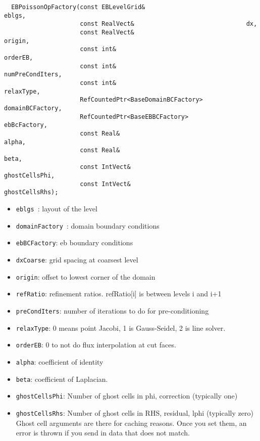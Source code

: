 \begin{small}\begin{verbatim}
  EBPoissonOpFactory(const EBLevelGrid&                            eblgs,
                     const RealVect&                               dx,
                     const RealVect&                               origin,
                     const int&                                    orderEB,
                     const int&                                    numPreCondIters,
                     const int&                                    relaxType,
                     RefCountedPtr<BaseDomainBCFactory>            domainBCFactory,
                     RefCountedPtr<BaseEBBCFactory>                ebBcFactory,
                     const Real&                                   alpha,
                     const Real&                                   beta,
                     const IntVect&                                ghostCellsPhi,
                     const IntVect&                                ghostCellsRhs);
\end{verbatim}\end{small}
\begin{itemize}
     \item {\tt eblgs }: layout of the level
     \item {\tt domainFactory }: domain boundary conditions 
     \item {\tt ebBCFactory}:    eb boundary conditions 
     \item {\tt dxCoarse}:      grid spacing at coarsest level 
     \item {\tt origin}:        offset to lowest corner of the domain 
     \item {\tt refRatio}:     refinement ratios. refRatio[i] is between levels i and i+1 
     \item {\tt preCondIters}:  number of iterations to do for pre-conditioning 
     \item {\tt relaxType}:     0 means point Jacobi, 1 is Gauss-Seidel, 2 is line solver. 
     \item {\tt orderEB}:       0 to not do flux interpolation at cut faces. 
     \item {\tt alpha}:         coefficient of identity 
     \item {\tt beta}:          coefficient of Laplacian.
     \item {\tt ghostCellsPhi}:  Number of ghost cells in phi, correction (typically one)
     \item {\tt ghostCellsRhs}:  Number of ghost cells in RHS, residual, lphi (typically zero)
     Ghost cell arguments are there for caching reasons.  Once you set them, an error is thrown if 
     you send in data that does not match.   
\end{itemize}

